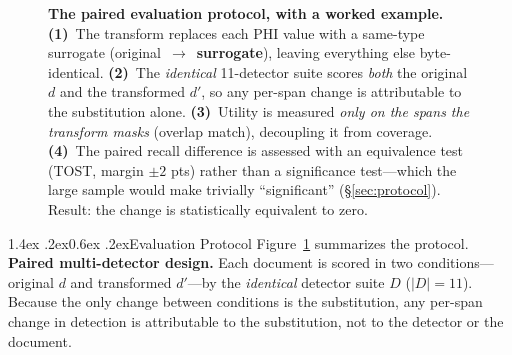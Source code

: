 \documentclass[11pt]{article}
\makeatletter
\newcommand{\oldv}[1]{\textcolor{cclay}{#1}}
\newcommand{\newv}[1]{\textcolor{caccent}{\textbf{#1}}}
\renewcommand\section{\@startsection{section}{1}{\z@}%
  {1.4ex \@plus.2ex}{0.6ex \@plus.2ex}{\normalfont\large\bfseries}}
\makeatother
\begin{document}
\begin{figure}[t]
\caption{\textbf{The paired evaluation protocol, with a worked example.} \textbf{(1)}~The transform replaces each PHI value with a same-type surrogate (\oldv{original}~$\rightarrow$~\newv{surrogate}), leaving everything else byte-identical. \textbf{(2)}~The \emph{identical} 11-detector suite scores \emph{both} the original $d$ and the transformed $d'$, so any per-span change is attributable to the substitution alone. \textbf{(3)}~Utility is measured \emph{only on the spans the transform masks} (overlap match), decoupling it from coverage. \textbf{(4)}~The paired recall difference is assessed with an equivalence test (TOST, margin $\pm2$ pts) rather than a significance test---which the large sample would make trivially ``significant'' (\S\ref{sec:protocol}). Result: the change is statistically equivalent to zero.}
\label{fig:protocol}
\end{figure}

\section{Evaluation Protocol}\label{sec:protocol}
Figure~\ref{fig:protocol} summarizes the protocol. \textbf{Paired multi-detector design.} Each document is scored in two conditions---original $d$ and transformed $d'$---by the \emph{identical} detector suite $D$ ($|D|=11$). Because the only change between conditions is the substitution, any per-span change in detection is attributable to the substitution, not to the detector or the document.
\end{document}
